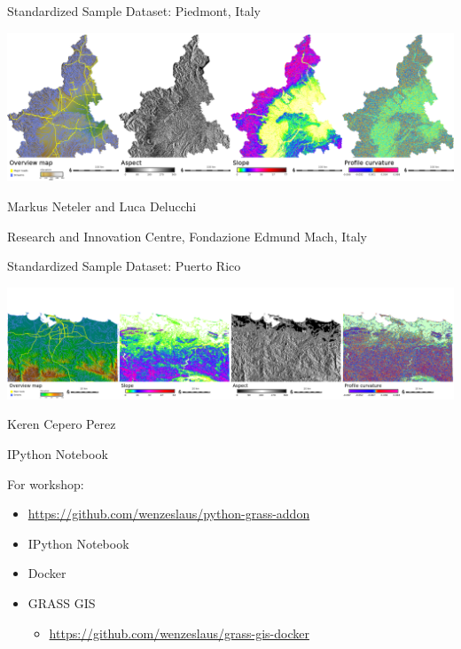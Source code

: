 \documentclass[xcolor={dvipsnames,usenames},beamer]{beamer}
\begin{document}
\begin{frame}{Standardized Sample Dataset: Piedmont, Italy}

\begin{center}
\includegraphics[width=\textwidth]{./images/dataset/std_dataset_it_stripe.png}
\end{center}


Markus Neteler and Luca Delucchi

\bigskip

{\scriptsize
Research and Innovation Centre, Fondazione Edmund Mach, Italy
}

\end{frame}

\begin{frame}{Standardized Sample Dataset: Puerto Rico}

\begin{center}
\includegraphics[width=\textwidth]{./images/dataset/std_dataset_pr_stripe.png}
\end{center}

Keren Cepero Perez


\end{frame}


\begin{frame}{IPython Notebook}

For workshop:
\begin{itemize}
 \item \url{https://github.com/wenzeslaus/python-grass-addon}
\end{itemize}


\begin{itemize}
 \item IPython Notebook
 \item Docker
 \item GRASS GIS
 \begin{itemize}
  \item \url{https://github.com/wenzeslaus/grass-gis-docker}
 \end{itemize}

\end{itemize}

\end{frame}
\end{document}
